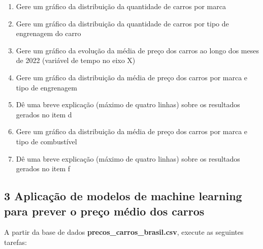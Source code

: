 \begin{enumerate}[series=listWWNumx,label=\alph*.,ref=\alph*]
\item Gere um gráfico da distribuição da quantidade de carros por marca
\item Gere um gráfico da distribuição da quantidade de carros por tipo de engrenagem do carro
\item Gere um gráfico da evolução da média de preço dos carros ao longo dos meses de 2022 (variável de tempo no eixo X)
\item Gere um gráfico da distribuição da média de preço dos carros por marca e tipo de engrenagem
\item Dê uma breve explicação (máximo de quatro linhas) sobre os resultados gerados no item d
\item Gere um gráfico da distribuição da média de preço dos carros por marca e tipo de combustível
\item Dê uma breve explicação (máximo de quatro linhas) sobre os resultados gerados no item f
\end{enumerate}






\subsection*{\textbf{3 Aplicação de modelos de machine learning para prever o preço médio dos carros}}




{\centering
A partir da base de dados \textbf{precos\_carros\_brasil.csv}, execute as seguintes tarefas:
\par}

